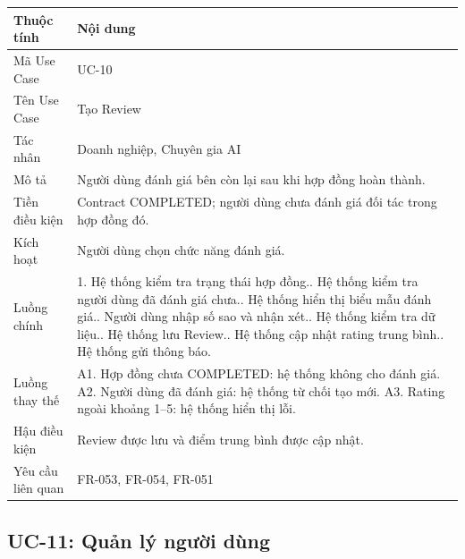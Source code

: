 \begin{longtable}{|p{3.5cm}|p{10.2cm}|}
\hline
\textbf{Thuộc tính} & \textbf{Nội dung} \\ \hline
Mã Use Case & UC-10 \\ \hline
Tên Use Case & Tạo Review \\ \hline
Tác nhân & Doanh nghiệp, Chuyên gia AI \\ \hline
Mô tả & Người dùng đánh giá bên còn lại sau khi hợp đồng hoàn thành. \\ \hline
Tiền điều kiện & Contract COMPLETED; người dùng chưa đánh giá đối tác trong hợp đồng đó. \\ \hline
Kích hoạt & Người dùng chọn chức năng đánh giá. \\ \hline
Luồng chính &
1. Hệ thống kiểm tra trạng thái hợp đồng.\newline
2. Hệ thống kiểm tra người dùng đã đánh giá chưa.\newline
3. Hệ thống hiển thị biểu mẫu đánh giá.\newline
4. Người dùng nhập số sao và nhận xét.\newline
5. Hệ thống kiểm tra dữ liệu.\newline
6. Hệ thống lưu Review.\newline
7. Hệ thống cập nhật rating trung bình.\newline
8. Hệ thống gửi thông báo. \\ \hline
Luồng thay thế &
A1. Hợp đồng chưa COMPLETED: hệ thống không cho đánh giá.\newline
A2. Người dùng đã đánh giá: hệ thống từ chối tạo mới.\newline
A3. Rating ngoài khoảng 1--5: hệ thống hiển thị lỗi. \\ \hline
Hậu điều kiện & Review được lưu và điểm trung bình được cập nhật. \\ \hline
Yêu cầu liên quan & FR-053, FR-054, FR-051 \\ \hline
\end{longtable}

\subsection{UC-11: Quản lý người dùng}

